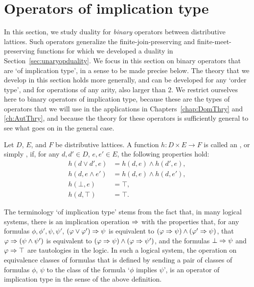 \section{Operators of implication type}\label{sec:generalopduality}
In this section, we study duality for \emph{binary} operators between
distributive lattices. Such operators generalize the finite-join-preserving and
finite-meet-preserving functions for which we developed a duality in
Section~\ref{sec:unaryopduality}. We focus in this section on binary operators
that are `of implication type', in a sense to be made precise below. The theory
that we develop in this section holds more generally, and can be developed for
any `order type', and for operations of any arity, also larger than $2$. We
restrict ourselves here to binary operators of implication type, because these
are the types of operators that we will use in the applications in
Chapters~\ref{chap:DomThry} and \ref{ch:AutThry}, and because the theory for
these operators is sufficiently general to see what goes on in the general case.

\begin{definition}\label{dfn:implicationtype} Let $D$, $E$, and $F$ be
distributive lattices. A function $h \colon D \times E \to F$ is called an
, or simply , if, for any $d, d' \in D$, $e, e' \in E$,
the following properties hold: \begin{align*} h(d \vee d', e) &= h(d, e) \wedge
h(d', e), \\ h(d, e \wedge e') &= h(d, e) \wedge h(d, e'), \\ h(\bot, e) &=
\top,\\ h(d, \top) &= \top.  \end{align*} \end{definition} The terminology `of
implication type' stems from the fact that, in many logical systems, there is an
implication operation $\Rightarrow$ with the properties that, for any formulas $\phi,
\phi', \psi, \psi'$, $(\varphi \vee \varphi') \Rightarrow \psi$ is equivalent to $(\varphi \Rightarrow
\psi) \wedge (\varphi' \Rightarrow \psi)$, that $\varphi \Rightarrow (\psi \wedge \psi')$ is
equivalent to $(\varphi \Rightarrow \psi) \wedge (\varphi \Rightarrow \psi')$, and the formulas $\bot
\Rightarrow \psi$ and $\varphi \Rightarrow \top$ are tautologies in the logic.  In such a logical
system, the operation on equivalence classes of formulas that is defined by
sending a pair of classes of formulas $\phi$, $\psi$ to the class of the formula
`$\phi$ implies $\psi$', is an operator of implication type in the sense of the
above definition.

